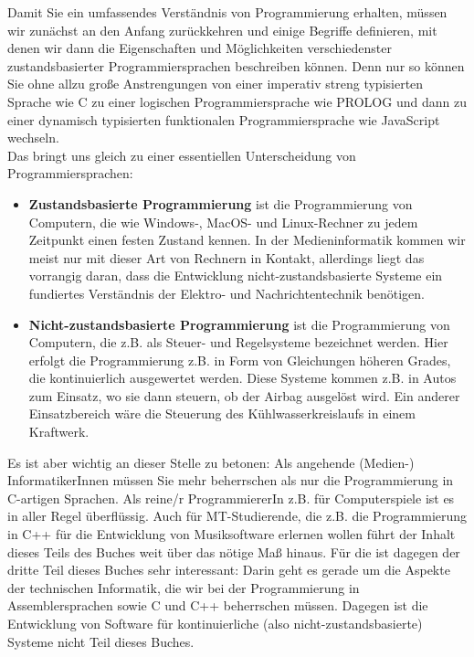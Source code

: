 Damit Sie ein umfassendes Verständnis von Programmierung erhalten, müssen wir zunächst an den Anfang zurückkehren und einige Begriffe definieren, mit denen wir dann die Eigenschaften und Möglichkeiten verschiedenster zustandsbasierter Programmiersprachen beschreiben können. Denn nur so können Sie ohne allzu große Anstrengungen von einer imperativ streng typisierten Sprache wie C zu einer logischen Programmiersprache wie PROLOG und dann zu einer dynamisch typisierten funktionalen Programmiersprache wie JavaScript wechseln.\\

Das bringt uns gleich zu einer essentiellen Unterscheidung von Programmiersprachen:\\

\begin{itemize}
	\item \textbf{Zustandsbasierte Programmierung} ist die Programmierung von Computern, die wie Windows-, MacOS- und Linux-Rechner zu jedem Zeitpunkt einen festen Zustand kennen. In der Medieninformatik kommen wir meist nur mit dieser Art von Rechnern in Kontakt, allerdings liegt das vorrangig daran, dass die Entwicklung nicht-zustandsbasierte Systeme ein fundiertes Verständnis der Elektro- und Nachrichtentechnik benötigen.
	\item \textbf{Nicht-zustandsbasierte Programmierung} ist die Programmierung von Computern, die z.B. als Steuer- und Regelsysteme bezeichnet werden. Hier erfolgt die Programmierung z.B. in Form von Gleichungen höheren Grades, die kontinuierlich ausgewertet werden. Diese Systeme kommen z.B. in Autos zum Einsatz, wo sie dann steuern, ob der Airbag ausgelöst wird. Ein anderer Einsatzbereich wäre die Steuerung des Kühlwasserkreislaufs in einem Kraftwerk.
\end{itemize}

Es ist aber wichtig an dieser Stelle zu betonen: Als angehende (Medien-) InformatikerInnen müssen Sie mehr beherrschen als nur die Programmierung in C-artigen Sprachen. Als reine/r ProgrammiererIn z.B. für Computerspiele ist es in aller Regel überflüssig. Auch für MT-Studierende, die z.B. die Programmierung in C++ für die Entwicklung von Musiksoftware erlernen wollen führt der Inhalt dieses Teils des Buches weit über das nötige Maß hinaus. Für die ist dagegen der dritte Teil dieses Buches sehr interessant: Darin geht es gerade um die Aspekte der technischen Informatik, die wir bei der Programmierung in Assemblersprachen sowie C und C++ beherrschen müssen. Dagegen ist die Entwicklung von Software für kontinuierliche (also nicht-zustandsbasierte) Systeme nicht Teil dieses Buches.

